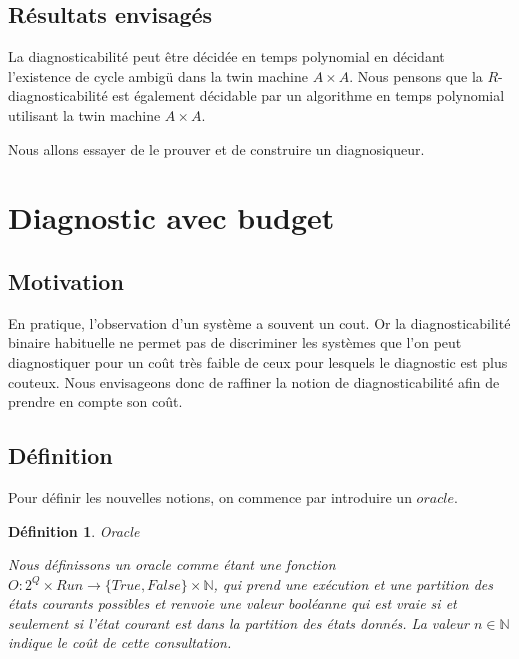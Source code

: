 \documentclass[a4paper,10pt]{article}
\newtheorem{mydef}{D\'efinition}
\begin{document}
\subsection{R\'esultats envisag\'es}

La diagnosticabilit\'e peut \^etre d\'ecid\'ee en temps polynomial en d\'ecidant l'existence de cycle ambig\"u dans la twin machine $A\times A$. Nous pensons que la $R$-diagnosticabilit\'e est \'egalement d\'ecidable par un algorithme en temps polynomial utilisant la twin machine $A\times A$.

Nous allons essayer de le prouver et de construire un diagnosiqueur.




\section{Diagnostic avec budget}
\subsection{Motivation}

En pratique, l'observation d'un système a souvent un cout. Or la diagnosticabilité binaire habituelle ne permet pas de discriminer les systèmes que l'on peut diagnostiquer pour un coût très faible de ceux pour lesquels le diagnostic est plus couteux. Nous envisageons donc de raffiner la notion de diagnosticabilit\'e afin de prendre en compte son coût.


\subsection{D\'efinition}

Pour d\'efinir les nouvelles notions, on commence par introduire un $oracle$.

\begin{mydef}{Oracle}

  Nous d\'efinissons un oracle comme \'etant une fonction $O: 2^Q\times Run \to \{True, False\} \times \mathbb{N}$, qui prend une ex\'ecution et une partition des \'etats courants possibles et renvoie une valeur bool\'eanne qui est vraie si et seulement si l'\'etat courant est dans la partition des \'etats donn\'es. La valeur $n \in \mathbb{N}$ indique le co\^ut de cette consultation.

\end{mydef}
\end{document}
